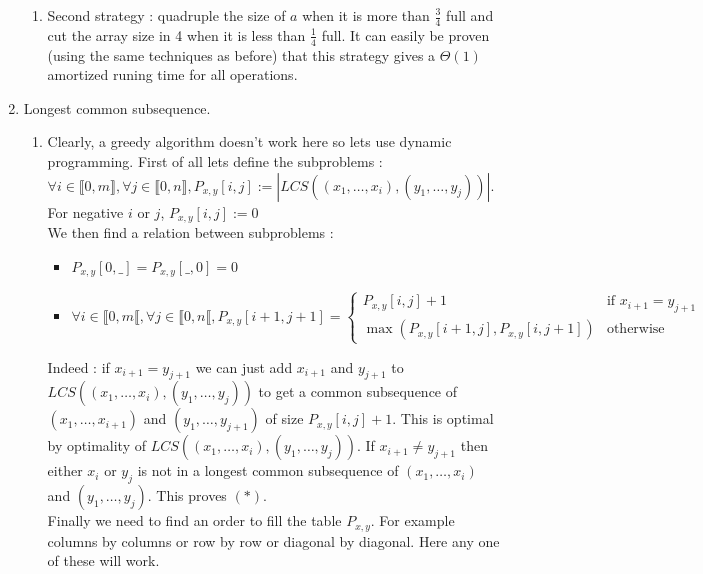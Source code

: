 \documentclass[12pt,4paper]{article}
\begin{document}
\begin{enumerate}
\begin{enumerate}
\item Second strategy : quadruple the size of $a$ when it is more than
$\frac{3}{4}$ full and cut the array size in 4 when it is less than
$\frac{1}{4}$ full. It can easily be proven (using the same techniques as
before) that this strategy gives a
$\Theta(1)$ amortized runing time for all operations.
\end{enumerate}

\item Longest common subsequence.

\begin{enumerate}

\item Clearly, a greedy algorithm doesn't work here so lets use dynamic
programming. First of all lets define the subproblems :\\
$\forall i \in \llbracket 0, m \rrbracket, \forall j \in
\llbracket 0, n \rrbracket, P_{x, y}[i, j] := |LCS((x_1, \dots, x_i), (y_1,
\dots, y_j))|$.\\
For negative $i$ or $j$, $P_{x, y}[i, j] := 0$\\
We then find a relation between subproblems :
\begin{itemize}
\item
$
P_{x, y}[0, \_] = P_{x, y}[\_, 0] = 0
$
\item
$
\forall i \in \llbracket 0, m \llbracket,
\forall j \in \llbracket 0, n \llbracket,
P_{x, y}[i + 1, j + 1] =
\left\{ \begin{array}{ll}
		P_{x, y}[i, j] + 1 & \mbox{if } x_{i + 1} = y_{j + 1}\\
		\max(P_{x, y}[i + 1, j], P_{x, y}[i, j  + 1]) & \mbox{otherwise}

	\end{array}
\right.
$
\end{itemize}
Indeed : if $x_{i + 1} = y_{j + 1}$ we can just add $x_{i + 1}$ and $y_{j + 1}$ to $LCS((x_1, \dots, x_i), (y_1, \dots, y_j))$ to get a common subsequence of $(x_1, \dots, x_{i + 1})$ and $(y_1, \dots, y_{j + 1})$ of size $P_{x, y}[i, j] + 1$. This is optimal by optimality of $LCS((x_1, \dots, x_i), (y_1, \dots, y_j))$. If $x_{i + 1} \neq y_{j + 1}$ then either $x_i$ or $y_j$ is not in a longest common subsequence of $(x_1, \dots, x_i)$ and $(y_1, \dots, y_j)$. This proves $(*)$.\\
Finally we need to find an order to fill the table $P_{x, y}$. For example
columns by columns or row by row or diagonal by diagonal. Here any one of these
will work.


\end{enumerate}
\end{enumerate}
\end{document}
